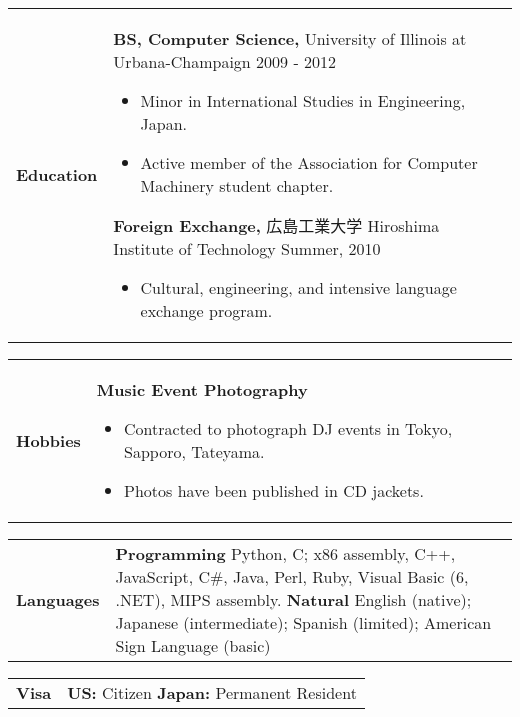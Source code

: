 \documentclass[11pt,a4paper]{article}
\begin{document}
\begin{CJK}{UTF8}{goth}
\begin{tabularx}{\textwidth}{ p{20mm} X}
	\textbf{Education} &
	{\bf BS, Computer Science,} University of Illinois at Urbana-Champaign \hfill {\scriptsize 2009 - 2012}
	\begin{itemize}[noitemsep,nolistsep]
		\item Minor in International Studies in Engineering, Japan.
		\item Active member of the Association for Computer Machinery student chapter.
	\end{itemize}
	\hfill \break
	{\bf Foreign Exchange,} 広島工業大学 Hiroshima Institute of Technology \hfill {\scriptsize Summer, 2010}
	\begin{itemize}[noitemsep,nolistsep]
		\item Cultural, engineering, and intensive language exchange program.
	\end{itemize}
\end{tabularx}

\begin{tabularx}{\textwidth}{ p{20mm} X}
	\textbf{Hobbies} &
	{\bf Music Event Photography}
	\begin{itemize}[noitemsep,nolistsep]
		\item Contracted to photograph DJ events in Tokyo, Sapporo, Tateyama.
		\item Photos have been published in CD jackets.
	\end{itemize}
\end{tabularx}

\begin{tabularx}{\textwidth}{ p{20mm} X}
	\textbf{Languages} &
	\textbf{Programming} \newline Python, C; x86 assembly, C++, JavaScript, C\#, Java, Perl, Ruby, Visual Basic (6, .NET), MIPS assembly. \newline
	\textbf{Natural} \newline English (native); Japanese (intermediate); Spanish (limited); American Sign Language (basic)
\end{tabularx}


\hfill \break

\begin{tabularx}{\textwidth}{ p{20mm} X}
	\textbf{Visa} &
	\textbf{US:} Citizen \newline
	\textbf{Japan:} Permanent Resident
\end{tabularx}

\end{CJK}
\end{document}
